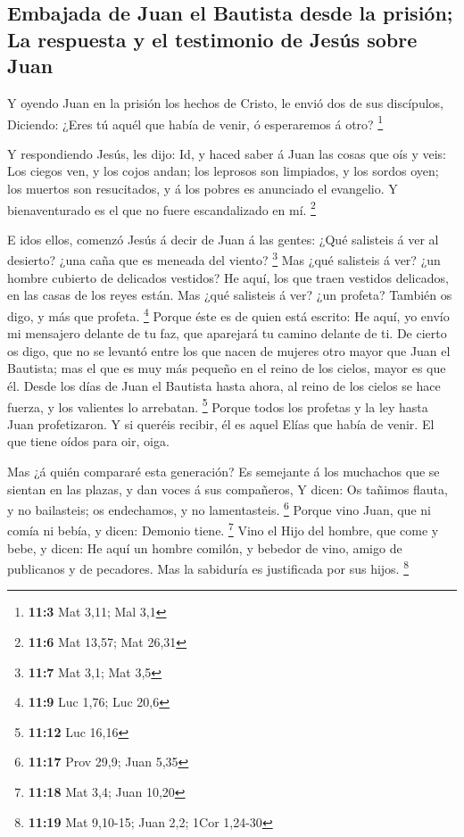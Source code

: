 \hypertarget{embajada-de-juan-el-bautista-desde-la-prisiuxf3n-la-respuesta-y-el-testimonio-de-jesuxfas-sobre-juan}{%
\subsection{Embajada de Juan el Bautista desde la prisión; La respuesta
y el testimonio de Jesús sobre
Juan}\label{embajada-de-juan-el-bautista-desde-la-prisiuxf3n-la-respuesta-y-el-testimonio-de-jesuxfas-sobre-juan}}

 Y oyendo Juan en la prisión los hechos de Cristo, le
envió dos de sus discípulos,  Diciendo: ¿Eres tú aquél que
había de venir, ó esperaremos á otro? \footnote{\textbf{11:3} Mat 3,11;
  Mal 3,1}

 Y respondiendo Jesús, les dijo: Id, y haced saber á Juan
las cosas que oís y veis:  Los ciegos ven, y los cojos
andan; los leprosos son limpiados, y los sordos oyen; los muertos son
resucitados, y á los pobres es anunciado el evangelio.  Y
bienaventurado es el que no fuere escandalizado en mí. \footnote{\textbf{11:6}
  Mat 13,57; Mat 26,31}

 E idos ellos, comenzó Jesús á decir de Juan á las gentes:
¿Qué salisteis á ver al desierto? ¿una caña que es meneada del viento?
\footnote{\textbf{11:7} Mat 3,1; Mat 3,5}  Mas ¿qué
salisteis á ver? ¿un hombre cubierto de delicados vestidos? He aquí, los
que traen vestidos delicados, en las casas de los reyes están.
 Mas ¿qué salisteis á ver? ¿un profeta? También os digo, y
más que profeta. \footnote{\textbf{11:9} Luc 1,76; Luc 20,6}
 Porque éste es de quien está escrito: He aquí, yo envío
mi mensajero delante de tu faz, que aparejará tu camino delante de ti.
 De cierto os digo, que no se levantó entre los que nacen
de mujeres otro mayor que Juan el Bautista; mas el que es muy más
pequeño en el reino de los cielos, mayor es que él. 
Desde los días de Juan el Bautista hasta ahora, al reino de los cielos
se hace fuerza, y los valientes lo arrebatan. \footnote{\textbf{11:12}
  Luc 16,16}  Porque todos los profetas y la ley hasta
Juan profetizaron.  Y si queréis recibir, él es aquel
Elías que había de venir.  El que tiene oídos para oir,
oiga.

 Mas ¿á quién compararé esta generación? Es semejante á
los muchachos que se sientan en las plazas, y dan voces á sus
compañeros,  Y dicen: Os tañimos flauta, y no bailasteis;
os endechamos, y no lamentasteis. \footnote{\textbf{11:17} Prov 29,9;
  Juan 5,35}  Porque vino Juan, que ni comía ni bebía, y
dicen: Demonio tiene. \footnote{\textbf{11:18} Mat 3,4; Juan 10,20}
 Vino el Hijo del hombre, que come y bebe, y dicen: He
aquí un hombre comilón, y bebedor de vino, amigo de publicanos y de
pecadores. Mas la sabiduría es justificada por sus hijos. \footnote{\textbf{11:19}
  Mat 9,10-15; Juan 2,2; 1Cor 1,24-30}

